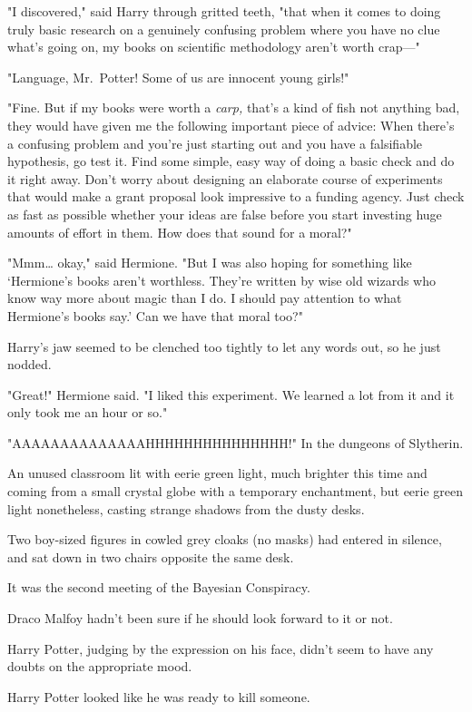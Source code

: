"I discovered," said Harry through gritted teeth, "that when it comes to doing 
truly basic research on a genuinely confusing problem where you have no clue 
what's going on, my books on scientific methodology aren't worth crap---"

"Language, Mr.~Potter! Some of us are innocent young girls!"

"Fine. But if my books were worth a \emph{carp,} that's a kind of fish not 
anything bad, they would have given me the following important piece of advice: 
When there's a confusing problem and you're just starting out and you have a 
falsifiable hypothesis, go test it. Find some simple, easy way of doing a basic 
check and do it right away. Don't worry about designing an elaborate course of 
experiments that would make a grant proposal look impressive to a funding 
agency. Just check as fast as possible whether your ideas are false before you 
start investing huge amounts of effort in them. How does that sound for a 
moral?"

"Mmm{\ldots} okay," said Hermione. "But I was also hoping for something like 
`Hermione's books aren't worthless. They're written by wise old wizards who 
know way more about magic than I do. I should pay attention to what Hermione's 
books say.' Can we have that moral too?"

Harry's jaw seemed to be clenched too tightly to let any words out, so he just 
nodded.

"Great!" Hermione said. "I liked this experiment. We learned a lot from it and 
it only took me an hour or so."

"AAAAAAAAAAAAAAHHHHHHHHHHHHHHH!"
\sbreak
In the dungeons of Slytherin.

An unused classroom lit with eerie green light, much brighter this time and 
coming from a small crystal globe with a temporary enchantment, but eerie green 
light nonetheless, casting strange shadows from the dusty desks.

Two boy-sized figures in cowled grey cloaks (no masks) had entered in silence, 
and sat down in two chairs opposite the same desk.

It was the second meeting of the Bayesian Conspiracy.

Draco Malfoy hadn't been sure if he should look forward to it or not.

Harry Potter, judging by the expression on his face, didn't seem to have any 
doubts on the appropriate mood.

Harry Potter looked like he was ready to kill someone.

